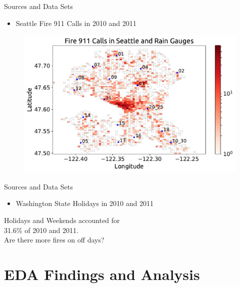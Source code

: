 \documentclass[t,11pt,compress,xcolor=table,hyperref={bookmarks=false}]{beamer}
\begin{document}
\begin{frame}{Sources and Data Sets}
\begin{itemize}
\item {\Large Seattle Fire 911 Calls in 2010 and 2011 \cite{FireData2018}}
\end{itemize}
\vspace{-0.3cm}
\begin{figure}[ht!]
\centering
\includegraphics[scale=0.52]{figs/2DHist.pdf}
\end{figure}
\end{frame}

\begin{frame}{Sources and Data Sets}
\begin{itemize}
\item {\Large Washington State Holidays in 2010 and 2011 \cite{OfficeHolidays2010,OfficeHolidays2011}}
\end{itemize}
\vspace{0.3cm}
\begin{center}
\Large
Holidays and Weekends accounted for
\\
31.6\% of 2010 and 2011.
\\
\vspace{0.3cm}
Are there more fires on off days?
\end{center}
\end{frame}


\section{EDA Findings and Analysis}
\end{document}
